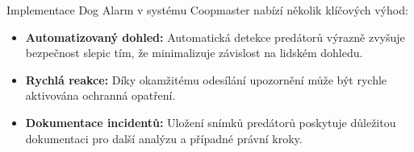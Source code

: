 Implementace Dog Alarm v systému Coopmaster nabízí několik klíčových výhod:
\begin{itemize}
    \item \textbf{Automatizovaný dohled:} Automatická detekce predátorů výrazně zvyšuje bezpečnost slepic tím, že minimalizuje závislost na lidském dohledu.
    \item \textbf{Rychlá reakce:} Díky okamžitému odesílání upozornění může být rychle aktivována ochranná opatření.
    \item \textbf{Dokumentace incidentů:} Uložení snímků predátorů poskytuje důležitou dokumentaci pro další analýzu a případné právní kroky.
\end{itemize}

